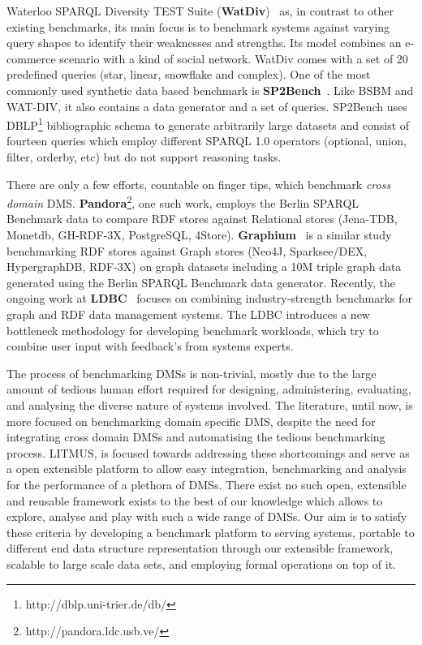 \documentclass{llncs}
\begin{document}
    Waterloo SPARQL Diversity TEST Suite (\textbf{WatDiv})~\cite{alucc2014diversified} as, in contrast to other existing benchmarks, its main focus is to benchmark systems against varying query shapes to identify their weaknesses and strengths.
    Its model combines an e-commerce scenario with a kind of social network.
    WatDiv comes with a set of 20 predefined queries (star, linear, snowflake and complex). 
    One of the most commonly used synthetic data based benchmark is \textbf{SP2Bench}~\cite{books/sp/virgilio09/SchmidtHMPL09}. Like BSBM and WAT-DIV, it also contains a data generator and a set of queries. SP2Bench uses DBLP\footnote{http://dblp.uni-trier.de/db/} bibliographic schema to generate arbitrarily large datasets and consist of fourteen queries which employ different SPARQL 1.0 operators (optional, union, filter, orderby, etc) but do not support reasoning tasks.
   
    
    There are only a few efforts, countable on finger tips, which benchmark \textit{cross domain} DMS. \textbf{Pandora}\footnote{http://pandora.ldc.usb.ve/}, one such work, employs the Berlin SPARQL Benchmark data to compare RDF stores against Relational stores (Jena-TDB, Monetdb, GH-RDF-3X, PostgreSQL, 4Store). 
    \textbf{Graphium}~\cite{flores2013graphium} is a similar study benchmarking RDF stores against Graph stores (Neo4J, Sparksee/DEX, HypergraphDB, RDF-3X) on graph datasets including a 10M triple graph data generated using the Berlin SPARQL Benchmark data generator. Recently, the ongoing work at \textbf{LDBC}~\cite{DBLP:journals/sigmod/AnglesBLF0ENMKT14} focuses on combining industry-strength benchmarks for graph and RDF data management systems.
    The LDBC introduces a new bottleneck methodology for developing benchmark workloads, which try to combine user input with feedback's from systems experts.%
    
    The process of benchmarking DMSs is non-trivial, mostly due to the large amount of tedious human effort required for designing, administering, evaluating, and analysing the diverse nature of systems involved. The literature, until now, is more focused on benchmarking domain specific DMS, despite the need for integrating cross domain DMSs and automatising the tedious benchmarking process. LITMUS, is focused towards addressing these shortcomings  and serve as a open extensible platform to allow easy integration, benchmarking and analysis for the performance of a plethora of DMSs. There exist no such open, extensible and reusable framework exists to the best of our knowledge which allows to explore, analyse and play with such a wide range of DMSs.
    Our aim is to satisfy these criteria by developing a benchmark platform to serving systems, portable to different end data structure representation through our extensible framework, scalable to large scale data sets, and employing formal operations on top of it.
    
\end{document}
